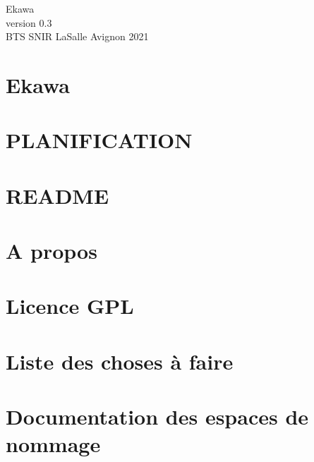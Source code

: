 \documentclass[twoside]{article}
\newcommand{\+}{\discretionary{\mbox{\scriptsize$\hookleftarrow$}}{}{}}
\begin{document}
\hypersetup{pageanchor=false,
             bookmarksnumbered=true,
             pdfencoding=unicode
            }
\begin{titlepage}
\vspace*{7cm}

\begin{center}%
{\LARGE Ekawa}\\
\vspace*{1cm}
{\large version 0.\+3}\\
\vspace*{1cm}
{\large B\+T\+S S\+N\+I\+R La\+Salle Avignon 2021}\\
\end{center}
\end{titlepage}
\tableofcontents
{}
\hypersetup{pageanchor=true}

\section{Ekawa}
\label{index}\hypertarget{index}{}
\section{P\+L\+A\+N\+I\+F\+I\+C\+A\+T\+I\+ON}
\label{md__planification__i_r}

\section{R\+E\+A\+D\+ME}
\label{page__r_e_a_d_m_e}

\section{A propos}
\label{page_about}

\section{Licence G\+PL}
\label{page_licence}

\section{Liste des choses à faire}
\label{todo}

\section{Documentation des espaces de nommage}



\end{document}
